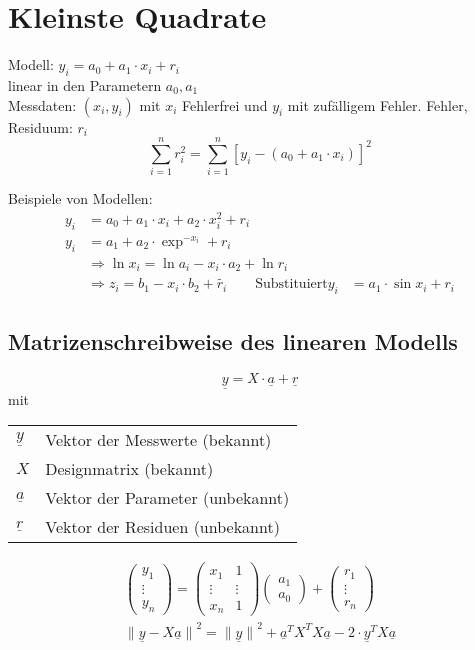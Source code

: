 \section{Kleinste Quadrate}
Modell: $y_i = a_0 + a_1 \cdot x_i + r_i$ \\
linear in den Parametern $a_0, a_1$ \\
Messdaten: $(x_i, y_i)$ mit $x_i$ Fehlerfrei und $y_i$ mit zuf\"alligem Fehler. Fehler,
Residuum: $r_i$
\begin{equation}
  \sum_{i=1}^n r_i^2 = \sum_{i=1}^n {\left[{y_i-(a_0+a_1\cdot x_i)}\right]}^2
\end{equation}

Beispiele von Modellen:
\begin{align}
  y_i &= a_0 + a_1 \cdot x_i + a_2 \cdot x_i^2 + r_i \\
  y_i &= a_1 + a_2 \cdot \exp^{-x_i} + r_i \\
  & \Longrightarrow \ln{x_i} = \ln{a_i} - x_i \cdot a_2 + \ln{r_i} \\
  & \Longrightarrow z_i = b_1 - x_i \cdot b_2 + \widetilde{r_i} \qquad\text{Substituiert}
  y_i &= a_1 \cdot \sin{x_i} + r_i
\end{align}

\subsection{Matrizenschreibweise des linearen Modells}
\begin{equation}
  \underline{y} = X \cdot \underline{a} + \underline{r}
\end{equation}
mit
\begin{tabular}{l l}
  $\underline{y}$ & Vektor der Messwerte (bekannt) \\
  $X$ & Designmatrix (bekannt) \\
  $\underline{a}$ & Vektor der Parameter (unbekannt) \\
  $\underline{r}$ & Vektor der Residuen (unbekannt) \\
\end{tabular}
\begin{gather}
  \begin{pmatrix} y_1 \\ \vdots \\ y_n \end{pmatrix} =
	\begin{pmatrix} x_1 & 1 \\ \vdots & \vdots \\ x_n & 1 \end{pmatrix}
	\begin{pmatrix} a_1 \\ a_0 \end{pmatrix} +
	\begin{pmatrix} r_1 \\ \vdots \\ r_n \end{pmatrix} \\
  {\|\underline{y}-X\underline{a}\|}^2 = {\|\underline{y}\|}^2 + \underline{a}^TX^TX\underline{a} - 2\cdot\underline{y}^TX\underline{a}
\end{gather}

